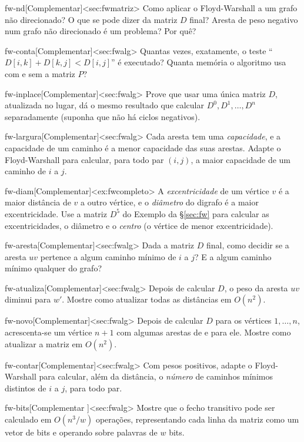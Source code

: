 \begin{exercicio}{fw-nd}[Complementar]<sec:fwmatriz>
Como aplicar o Floyd-Warshall a um grafo não direcionado? O que se pode dizer da matriz $D$ final? Aresta de peso negativo num grafo não direcionado é um problema? Por quê?
\end{exercicio}
\begin{exercicio}{fw-conta}[Complementar]<sec:fwalg>
Quantas vezes, exatamente, o teste ``$D[i,k]+D[k,j]<D[i,j]$'' é executado? Quanta memória o algoritmo usa com e sem a matriz $P$?
\end{exercicio}
\begin{exercicio}{fw-inplace}[Complementar]<sec:fwalg>
Prove que usar uma única matriz $D$, atualizada no lugar, dá o mesmo resultado que calcular $D^0,D^1,\dots,D^n$ separadamente (suponha que não há ciclos negativos).
\end{exercicio}
\begin{exercicio}{fw-largura}[Complementar]<sec:fwalg>
Cada aresta tem uma \emph{capacidade}, e a capacidade de um caminho é a menor capacidade das suas arestas. Adapte o Floyd-Warshall para calcular, para todo par $(i,j)$, a maior capacidade de um caminho de $i$ a $j$.
\end{exercicio}
\begin{exercicio}{fw-diam}[Complementar]<ex:fwcompleto>
A \emph{excentricidade} de um vértice $v$ é a maior distância de $v$ a outro vértice, e o \emph{diâmetro} do digrafo é a maior excentricidade. Use a matriz $D^5$ do Exemplo da §\ref{sec:fw} para calcular as excentricidades, o diâmetro e o \emph{centro} (o vértice de menor excentricidade).
\end{exercicio}
\begin{exercicio}{fw-aresta}[Complementar]<sec:fwalg>
Dada a matriz $D$ final, como decidir se a aresta $uv$ pertence a algum caminho mínimo de $i$ a $j$? E a algum caminho mínimo qualquer do grafo?
\end{exercicio}
\begin{exercicio}{fw-atualiza}[Complementar]<sec:fwalg>
Depois de calcular $D$, o peso da aresta $uv$ diminui para $w'$. Mostre como atualizar todas as distâncias em $O(n^2)$.
\end{exercicio}
\begin{exercicio}{fw-novo}[Complementar]<sec:fwalg>
Depois de calcular $D$ para os vértices $1,\dots,n$, acrescenta-se um vértice $n+1$ com algumas arestas de e para ele. Mostre como atualizar a matriz em $O(n^2)$.
\end{exercicio}
\begin{exercicio}{fw-contar}[Complementar]<sec:fwalg>
Com pesos positivos, adapte o Floyd-Warshall para calcular, além da distância, o \emph{número} de caminhos mínimos distintos de $i$ a $j$, para todo par.
\end{exercicio}
\begin{exercicio}{fw-bits}[Complementar \estrela]<sec:fwalg>
Mostre que o fecho transitivo pode ser calculado em $O(n^3/w)$ operações, representando cada linha da matriz como um vetor de bits e operando sobre palavras de $w$ bits.
\end{exercicio}
